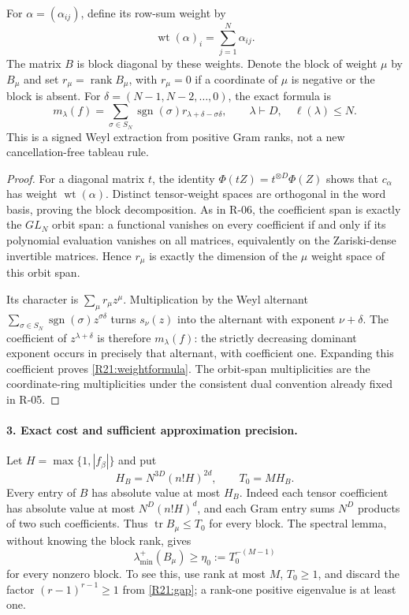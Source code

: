 For $\alpha=(\alpha_{ij})$, define its row-sum weight by
\[
 \operatorname{wt}(\alpha)_i=\sum_{j=1}^N\alpha_{ij}.
\]
The matrix $B$ is block diagonal by these weights. Denote the block
of weight $\mu$ by $B_\mu$ and set $r_\mu=\operatorname{rank}B_\mu$,
with $r_\mu=0$ if a coordinate of $\mu$ is negative or the block is
absent. For $\delta=(N-1,N-2,\ldots,0)$, the exact formula is
\begin{equation}\label{R21:weightformula}
 m_\lambda(f)=
 \sum_{\sigma\in S_N}\operatorname{sgn}(\sigma)
              r_{\lambda+\delta-\sigma\delta},
 \qquad \lambda\vdash D,\quad\ell(\lambda)\leq N.
\end{equation}
This is a signed Weyl extraction from positive Gram ranks, not a new
cancellation-free tableau rule.

\begin{proof}
For a diagonal matrix $t$, the identity
$\Phi(tZ)=t^{\otimes D}\Phi(Z)$ shows that $c_\alpha$ has weight
$\operatorname{wt}(\alpha)$. Distinct tensor-weight spaces are
orthogonal in the word basis, proving the block decomposition.
As in R-06, the coefficient span is exactly the $GL_N$ orbit span:
a functional vanishes on every coefficient if and only if its
polynomial evaluation vanishes on all matrices, equivalently on the
Zariski-dense invertible matrices. Hence $r_\mu$ is exactly the
dimension of the $\mu$ weight space of this orbit span.

Its character is $\sum_\mu r_\mu z^\mu$.
Multiplication by the Weyl alternant
$\sum_{\sigma\in S_N}\operatorname{sgn}(\sigma)z^{\sigma\delta}$
turns $s_\nu(z)$ into the alternant with exponent $\nu+\delta$.
The coefficient of $z^{\lambda+\delta}$ is therefore $m_\lambda(f)$:
the strictly decreasing dominant exponent occurs in precisely that
alternant, with coefficient one. Expanding this coefficient proves
\eqref{R21:weightformula}. The orbit-span multiplicities are the
coordinate-ring multiplicities under the consistent dual convention
already fixed in R-05.
\end{proof}

\paragraph{3. Exact cost and sufficient approximation precision.}
Let $H=\max\{1,|f_\beta|\}$ and put
\[
 H_B=N^{3D}(n!H)^{2d},\qquad T_0=MH_B.
\]
Every entry of $B$ has absolute value at most $H_B$.
Indeed each tensor coefficient has absolute value at most
$N^D(n!H)^d$, and each Gram entry sums $N^D$ products of two such
coefficients. Thus $\operatorname{tr}B_\mu\leq T_0$ for every block.
The spectral lemma, without knowing the block rank, gives
\begin{equation}\label{R21:uniformgap}
 \lambda_{\min}^{+}(B_\mu)\geq
 \eta_0:=T_0^{-(M-1)}
\end{equation}
for every nonzero block. To see this, use rank at most $M$,
$T_0\geq1$, and discard the factor $(r-1)^{r-1}\geq1$ from
\eqref{R21:gap}; a rank-one positive eigenvalue is at least one.

